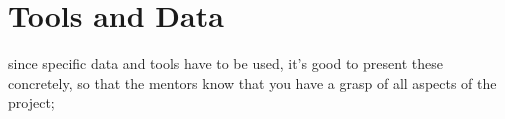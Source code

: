 \chapter{Tools and Data}
\label{chap:TD}

since specific data and tools have to be used, it’s good to present these concretely, so that the mentors know that you have a grasp of all aspects of the project;
\iffalse

\section{Data}
Topographic data\\
Sensor data (different sources)

\section{Database}
Postgres

\section{Server}
Localhost at first, but in the end host on university server.

\section{Prototype}
Use Python programming language and Flask for server sided scripts\\
Perhaps with Python's \href{http://docs.python-requests.org/en/latest/user/quickstart/}{Request} library for making POST or GET requests.  

\fi